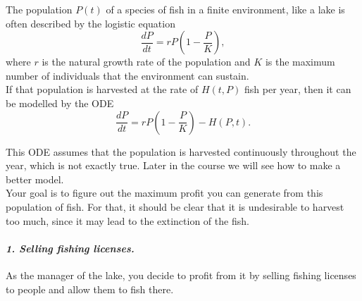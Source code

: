 The population $P(t)$ of a species of fish in a finite environment, like a lake is often described by the logistic equation
$$
\frac{dP}{dt} = r P \left(1 - \frac{P}{K} \right),
$$
where $r$ is the natural growth rate of the population and $K$ is the maximum number of individuals that the environment can sustain. \\

If that population is harvested at the rate of $H(t,P)$ fish per year, then it can be modelled by the ODE
$$
\frac{dP}{dt} = r P \left(1 - \frac{P}{K} \right) - H(P,t).
$$

This ODE assumes that the population is harvested continuously throughout the year, which is not exactly true. Later in the course we will see how to make a better model. \\


Your goal is to figure out the maximum profit you can generate from this population of fish. For that, it should be clear that it is undesirable to harvest too much, since it may lead to the extinction of the fish.


\paragraph{\emph{1. Selling fishing licenses.}}

As the manager of the lake, you decide to profit from it by selling fishing licenses to people and allow them to fish there. 


